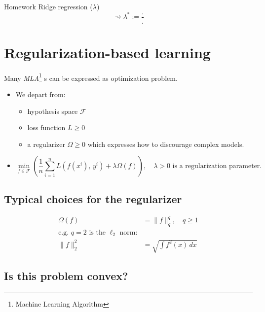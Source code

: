 \begin{exercise}{Homework}{}
Ridge regression ($\lambda$)
\begin{equation}
	\rightsquigarrow \lambda ^* := \frac{.}{.}
\end{equation}
\end{exercise}

\section{Regularization-based learning} %
\label{sec:Regularization-based-learning}

Many \emph{MLA}\footnote{Machine Learning Algorithm}%
s can be expressed as optimization problem.

\begin{itemize}
	\item We depart from:
	      \begin{itemize}
		      \item hypothesis space $\mathcal{F}$
		      \item loss function $L \geq 0$
		      \item a regularizer $\Omega \geq 0$ which expresses how to discourage complex models.
	      \end{itemize}
	\item
\[
	\min_{f \in \mathcal{F}} \left(\frac{1}{n} \sum_{i=1}^n L\left(f(x^i),\, y^i\right) + \lambda\Omega(f) \right)
	, \quad \lambda > 0 \text{ is a regularization parameter.}
\]

\end{itemize}

\subsection{Typical choices for the regularizer} %

\begin{align*}
	\Omega(f) & = \lVert f \rVert_q^q, \quad q \geq 1                 \\
	\text{e.g. } q = 2 \text{ is the } \ell_2 \text{ norm:} \\
	\lVert f \rVert_2^2 & = \sqrt{\int f^2(x) \, dx}
\end{align*}

\subsection*{Is this problem convex?} %

